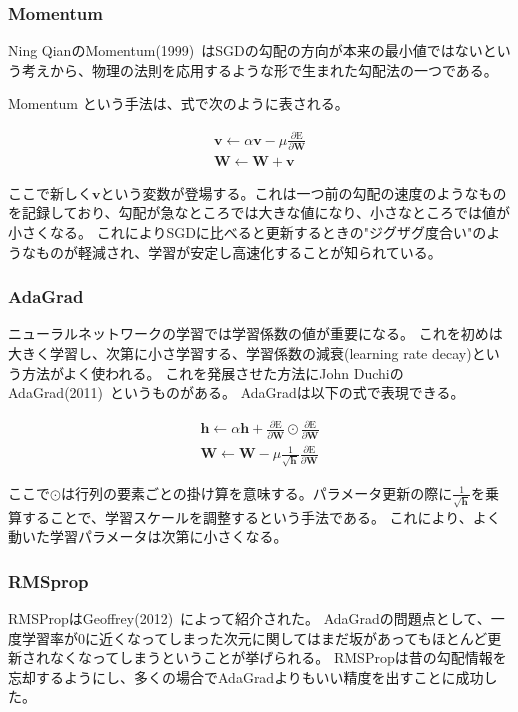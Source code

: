 \subsubsection{Momentum}

Ning QianのMomentum(1999)~\cite{momentum}はSGDの勾配の方向が本来の最小値ではないという考えから、物理の法則を応用するような形で生まれた勾配法の一つである。


Momentum という手法は、式で次のように表される。

\begin{eqnarray}
    \mathbf{v} \leftarrow \alpha \mathbf{v} - \mu \frac {\partial \mathrm{E} }{\partial \mathbf{W}} \\
    \mathbf{W} \leftarrow \mathbf{W+v}
\label{eq:momentum}
\end{eqnarray}

ここで新しく$ \mathbf{v} $という変数が登場する。これは一つ前の勾配の速度のようなものを記録しており、勾配が急なところでは大きな値になり、小さなところでは値が小さくなる。
これによりSGDに比べると更新するときの"ジグザグ度合い"のようなものが軽減され、学習が安定し高速化することが知られている。


\subsubsection{AdaGrad}

ニューラルネットワークの学習では学習係数の値が重要になる。
これを初めは大きく学習し、次第に小さ学習する、学習係数の減衰(learning rate decay)という方法がよく使われる。
これを発展させた方法にJohn DuchiのAdaGrad(2011)~\cite{adagrad}というものがある。
AdaGradは以下の式で表現できる。

\begin{eqnarray}　
    \mathbf{h} \leftarrow \alpha \mathbf{h} + \frac {\partial \mathrm{E} }{\partial \mathbf{W}} \odot \frac {\partial \mathrm{E} }{\partial \mathbf{W}}  \\
    \mathbf{W} \leftarrow \mathbf{W}  - \mu \frac{ 1 }{\sqrt{\mathbf{h}}} \frac{ \partial \mathrm{E} }{\partial \mathbf{W}} 
\label{eq:adagrad}
\end{eqnarray}

ここで$ \odot $は行列の要素ごとの掛け算を意味する。パラメータ更新の際に$ \frac{ 1 }{\sqrt{\mathbf{h}}} $を乗算することで、学習スケールを調整するという手法である。
これにより、よく動いた学習パラメータは次第に小さくなる。


\subsubsection{RMSprop}
RMSPropはGeoffrey(2012)~\cite{rmsprop}によって紹介された。
AdaGradの問題点として、一度学習率が0に近くなってしまった次元に関してはまだ坂があってもほとんど更新されなくなってしまうということが挙げられる。
RMSPropは昔の勾配情報を忘却するようにし、多くの場合でAdaGradよりもいい精度を出すことに成功した。



